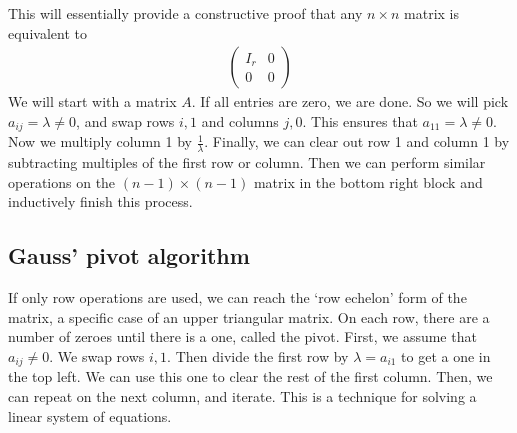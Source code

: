     This will essentially provide a constructive proof that any $n \times n$ matrix is equivalent to
    \begin{align*}
        \begin{pmatrix} I_r & 0 \\ 0 & 0 \end{pmatrix}
    \end{align*}
    We will start with a matrix $A$.
    If all entries are zero, we are done.
    So we will pick $a_{ij} = \lambda \neq 0$, and swap rows $i,1$ and columns $j,0$.
    This ensures that $a_{11} = \lambda \neq 0$.
    Now we multiply column 1 by $\frac{1}{\lambda}$.
    Finally, we can clear out row 1 and column 1 by subtracting multiples of the first row or column.
    Then we can perform similar operations on the $(n-1)\times(n-1)$ matrix in the bottom right block and inductively finish this process.

    \subsection{Gauss' pivot algorithm}
    If only row operations are used, we can reach the `row echelon' form of the matrix, a specific case of an upper triangular matrix.
    On each row, there are a number of zeroes until there is a one, called the pivot.
    First, we assume that $a_{ij} \neq 0$.
    We swap rows $i, 1$.
    Then divide the first row by $\lambda = a_{i1}$ to get a one in the top left.
    We can use this one to clear the rest of the first column.
    Then, we can repeat on the next column, and iterate.
    This is a technique for solving a linear system of equations.

